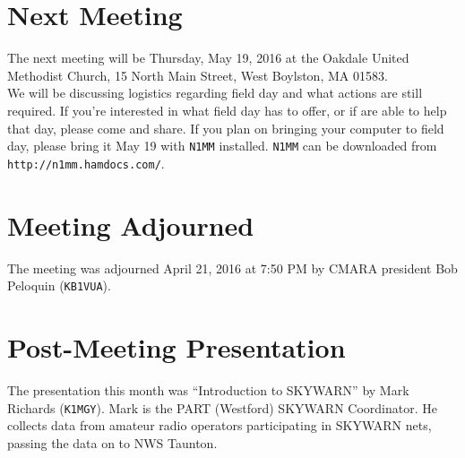 \documentclass[10pt,letterpaper]{article}
\begin{document}
\section{Next Meeting}

The next meeting will be Thursday, May 19, 2016 at the Oakdale United Methodist Church, 15 North Main Street, West Boylston, MA 01583.\\

\noindent
We will be discussing logistics regarding field day and what actions are still required. If you're interested in what field day has to offer, or if are able to help that day, please come and share. If you plan on bringing your computer to field day, please bring it May 19 with \texttt{N1MM} installed. \texttt{N1MM} can be downloaded from \texttt{http://n1mm.hamdocs.com/}.

\section{Meeting Adjourned}
The meeting was adjourned April 21, 2016 at 7:50 PM by CMARA president Bob Peloquin (\texttt{KB1VUA}).

\section{Post-Meeting Presentation}

The presentation this month was ``Introduction to SKYWARN'' by Mark Richards (\texttt{K1MGY}). Mark is the PART (Westford) SKYWARN Coordinator. He collects data from amateur radio operators participating in SKYWARN nets, passing the data on to NWS Taunton.
\end{document}
